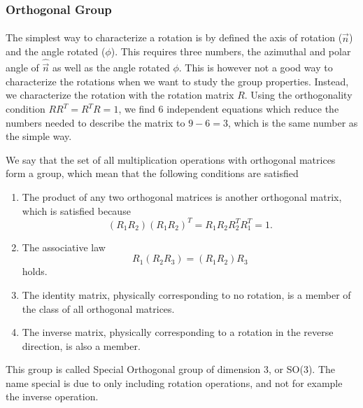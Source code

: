 \subsubsection{Orthogonal Group}
The simplest way to characterize a rotation is by defined the axis of rotation ($\hat{\vec{n}}$) and the angle rotated ($\phi$). This requires three numbers, the azimuthal and polar angle of $\hat{\vec{n}}$ as well as the angle rotated $\phi$. This is however not a good way to characterize the rotations when we want to study the group properties. Instead, we characterize the rotation with the rotation matrix $R$. Using the orthogonality condition $R R^T = R^T R = 1$, we find 6 independent equations which reduce the numbers needed to describe the matrix to $9-6 = 3$, which is the same number as the simple way. 

We say that the set of all multiplication operations with orthogonal matrices form a group, which mean that the following conditions are satisfied
\begin{enumerate}
    \item The product of any two orthogonal matrices is another orthogonal matrix, which is satisfied because 
        \begin{equation}
        (R_1 R_2)(R_1 R_2)^T = R_1 R_2 R_2^T R_1^T = 1.
        \end{equation}
    \item The associative law
        \begin{equation}
            R_1(R_2 R_3) = (R_1 R_2) R_3
        \end{equation}
        holds.
    \item The identity matrix, physically corresponding to no rotation, is a member of the class of all orthogonal matrices.
    \item The inverse matrix, physically corresponding to a rotation in the reverse direction, is also a member.
\end{enumerate}
This group is called Special Orthogonal group of dimension 3, or SO(3). The name special is due to only including rotation operations, and not for example the inverse operation.

